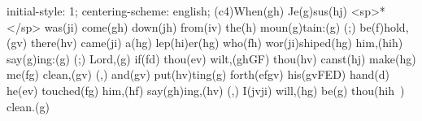 initial-style: 1;
centering-scheme: english;
(c4)When(gh) Je(g)sus(hj) <sp>*</sp> was(ji) come(gh) down(jh) from(iv) the(h) moun(g)tain:(g) (;) be(f)hold,(gv) there(hv) came(ji) a(hg) lep(hi)er(hg) who(fh) wor(ji)shiped(hg) him,(hih) say(g)ing:(g) (;) Lord,(g) if(fd) thou(ev) wilt,(ghGF) thou(hv) canst(hj) make(hg) me(fg) clean,(gv) (,) and(gv) put(hv)ting(g) forth(efgv) his(gvFED) hand(d) he(ev) touched(fg) him,(hf) say(gh)ing,(hv) (,) I(jvji) will,(hg) be(g) thou(hih~) clean.(g)
